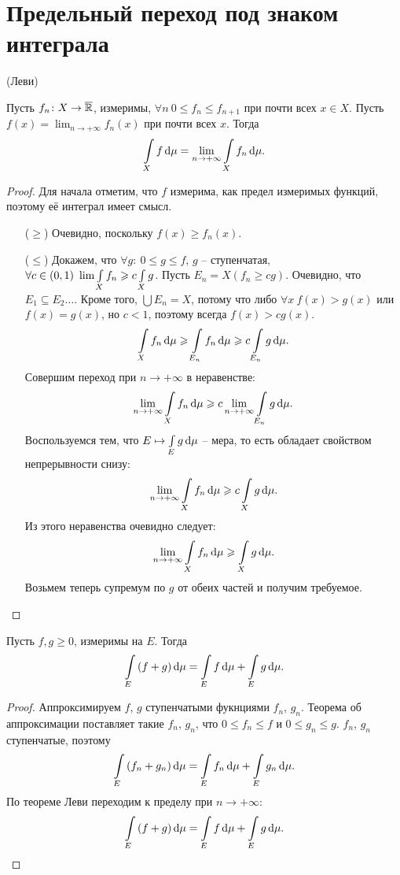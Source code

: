 \section{Предельный переход под знаком интеграла}

\begin{theorem}(Леви)

    Пусть $f_n \colon X \to \overline{\mathbb{R}}$, измеримы, $\forall n~ 0 \leqslant f_n \leqslant f_{n + 1}$
    при почти всех $x \in X$. Пусть $\displaystyle f(x) = \lim_{n \to +\infty}{f_n(x)}$ 
    при почти всех $x$. Тогда
\[
    \int\limits_X{f \,\mathrm{d}\mu} = \lim_{n \to +\infty}{\int\limits_X{f_n \,\mathrm{d}\mu}}
.\] 
\end{theorem}
\begin{proof}
    Для начала отметим, что $f$ измерима, как предел измеримых функций, поэтому её интеграл
    имеет смысл.
    \begin{itemize}
        \item[($\geqslant$)] Очевидно, поскольку $f(x) \geqslant f_n(x)$. 
        \item[($\leqslant$)] Докажем, что $\forall g\colon~ 0 \leqslant g \leqslant f$, 
            $g$ -- ступенчатая, $\forall c \in (0, 1)~ \lim{\int\limits_{X}{f_n}} 
            \geqslant c \int\limits_X{g}$. Пусть $E_n = X(f_n \geqslant c g)$. Очевидно, что
            $E_1 \subseteq E_2 \ldots$. Кроме того, $\bigcup{E_n} = X$, потому что
            либо $\forall x~ f(x) > g(x)$ или $f(x) = g(x)$, но $c < 1$, поэтому всегда
            $f(x) > c g(x)$.
\[
    \int\limits_X{f_n \,\mathrm{d}\mu} \geqslant \int\limits_{E_n}{f_n \,\mathrm{d}\mu} \geqslant c \int\limits_{E_n}{g \,\mathrm{d}\mu}
.\]
            Совершим переход при $n \to +\infty$ в неравенстве:
\[
    \lim_{n \to +\infty}{\int\limits_{X}{f_n \,\mathrm{d}\mu}} \geqslant c \lim_{n \to +\infty}{\int\limits_{E_n}{g \,\mathrm{d}\mu}}
.\]
            Воспользуемся тем, что $E \mapsto \int\limits_{E}{g \,\mathrm{d}\mu}$ -- мера, то есть обладает свойством
            непрерывности снизу:
\[
    \lim_{n \to +\infty}{\int\limits_{X}{f_n \,\mathrm{d}\mu}} \geqslant c \int\limits_{X}{g \,\mathrm{d}\mu}
.\]
            Из этого неравенства очевидно следует:
\[
    \lim_{n \to +\infty}{\int\limits_{X}{f_n \,\mathrm{d}\mu}} \geqslant \int\limits_{X}{g \,\mathrm{d}\mu}
.\]
            Возьмем теперь супремум по $g$ от обеих частей и получим требуемое.
    \end{itemize}
\end{proof}

\begin{theorem}

    Пусть $f, g \geqslant 0$, измеримы на $E$. Тогда
\[
    \int\limits_E{(f + g) \,\mathrm{d}\mu} = \int\limits_E{f \,\mathrm{d}\mu} + \int\limits_E{g \,\mathrm{d}\mu}
.\] 
\end{theorem}
\begin{proof}
    Аппроксимируем $f$, $g$ ступенчатыми фукнциями $f_n$, $g_n$.
    Теорема об аппроксимации поставляет такие $f_n$, $g_n$, что $0 \leqslant f_n \leqslant f$ и 
    $0 \leqslant g_n \leqslant g$. $f_n$, $g_n$ ступенчатые, поэтому
\[
    \int\limits_{E}{(f_n + g_n) \,\mathrm{d}\mu} = \int\limits_{E}{f_n \,\mathrm{d}\mu} + \int\limits_{E}{g_n \,\mathrm{d}\mu}
.\]
    По теореме Леви переходим к пределу при $n \to +\infty$:
\[
    \int\limits_{E}{(f + g) \,\mathrm{d}\mu} = \int\limits_{E}{f \,\mathrm{d}\mu} + \int\limits_{E}{g \,\mathrm{d}\mu}
.\]
\end{proof}

